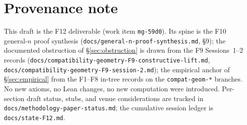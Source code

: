\documentclass[11pt,reqno]{amsart}
\theoremstyle{plain}
\theoremstyle{definition}
\begin{document}
\section*{Provenance note}
\noindent
\footnotesize
This draft is the F12 deliverable (work item \texttt{mg-59d0}). Its
spine is the F10 general-$n$ proof synthesis
(\texttt{docs/general-n-proof-synthesis.md}, \S9); the documented
obstruction of \S\ref{sec:obstruction} is drawn from the F9 Sessions~1--2
records (\texttt{docs/compatibility-geometry-F9-constructive-lift.md},
\texttt{docs/compatibility-geometry-F9-session-2.md}); the empirical
anchor of \S\ref{sec:empirical} from the F1--F8 in-tree records on the
\texttt{compat-geom-*} branches. No new axioms, no Lean changes, no new
computation were introduced. Per-section draft status, stubs, and venue
considerations are tracked in
\texttt{docs/methodology-paper-status.md}; the cumulative session ledger
is \texttt{docs/state-F12.md}.
\end{document}
